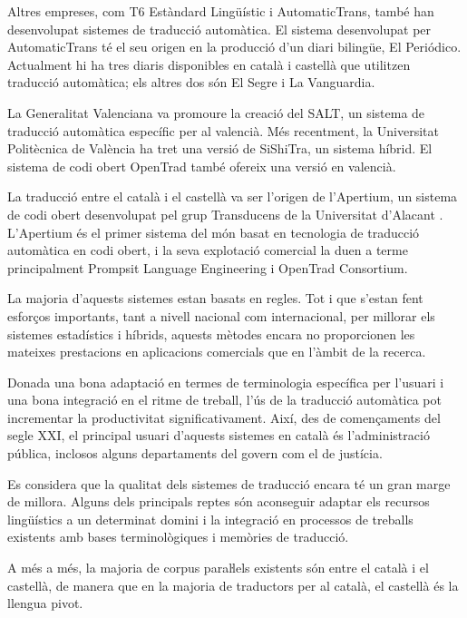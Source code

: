\begin{multicols}{2}
Altres empreses, com T6 Estàndard Lingüístic i AutomaticTrans, també han desenvolupat sistemes de traducció automàtica. El sistema desenvolupat per AutomaticTrans té el seu origen en la producció d’un diari bilingüe, El Periódico. Actualment hi ha tres diaris disponibles en català i castellà que utilitzen traducció automàtica; els altres dos són El Segre i La Vanguardia. 

La Generalitat Valenciana va promoure la creació del SALT, un sistema de traducció automàtica específic per al valencià. Més recentment, la Universitat Politècnica de València ha tret una versió de SiShiTra, un sistema híbrid. El sistema de codi obert OpenTrad també ofereix una versió en valencià. 

La traducció entre el català i el castellà va ser l’origen de l’Apertium, un sistema de codi obert desenvolupat pel grup Transducens \cite{CAT-transducens} de la Universitat d’Alacant \cite{CAT-UnivAlacant}. L’Apertium és el primer sistema del món basat en tecnologia de traducció automàtica en codi obert, i la seva explotació comercial la duen a terme principalment Prompsit Language Engineering i OpenTrad Consortium. 

La majoria d’aquests sistemes estan basats en regles. Tot i que s’estan fent esforços importants, tant a nivell nacional com internacional, per millorar els sistemes estadístics i híbrids, aquests mètodes encara no proporcionen les mateixes prestacions en aplicacions comercials que en l’àmbit de la recerca. 

Donada una bona adaptació en termes de terminologia específica per l’usuari i una bona integració en el ritme de treball, l’ús de la traducció automàtica pot incrementar la productivitat significativament. Així, des de començaments del segle XXI, el principal usuari d’aquests sistemes en català és l’administració pública, inclosos alguns departaments del govern com el de justícia.

Es considera que la qualitat dels sistemes de traducció encara té un gran marge de millora. Alguns dels principals reptes són aconseguir adaptar els recursos lingüístics a un determinat domini i la integració en processos de treballs existents amb bases terminològiques i memòries de traducció.

A més a més, la majoria de corpus paraŀlels existents són entre el català i el castellà, de manera que en la majoria de traductors per al català, el castellà és la llengua pivot.


\end{multicols}
